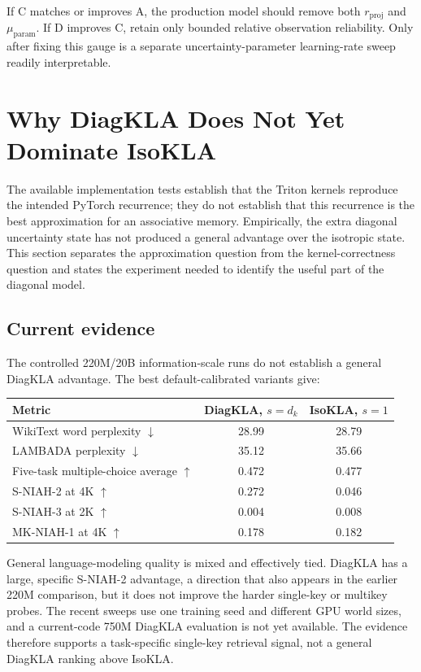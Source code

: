 \documentclass[11pt]{article}
\begin{document}
If C matches or improves A, the production model should remove both $r_{\mathrm{proj}}$ and
$\mu_{\mathrm{param}}$. If D improves C, retain only bounded relative observation reliability.
Only after fixing this gauge is a separate uncertainty-parameter learning-rate sweep readily
interpretable.

\section{Why DiagKLA Does Not Yet Dominate IsoKLA}

The available implementation tests establish that the Triton kernels reproduce the intended
PyTorch recurrence; they do not establish that this recurrence is the best approximation for an
associative memory. Empirically, the extra diagonal uncertainty state has not produced a general
advantage over the isotropic state. This section separates the approximation question from the
kernel-correctness question and states the experiment needed to identify the useful part of the
diagonal model.

\subsection{Current evidence}

The controlled 220M/20B information-scale runs do not establish a general DiagKLA advantage.
The best default-calibrated variants give:
\begin{center}
\begin{tabular}{lcc}
\toprule
Metric & DiagKLA, $s=d_k$ & IsoKLA, $s=1$ \\
\midrule
WikiText word perplexity $\downarrow$ & 28.99 & 28.79 \\
LAMBADA perplexity $\downarrow$ & 35.12 & 35.66 \\
Five-task multiple-choice average $\uparrow$ & 0.472 & 0.477 \\
S-NIAH-2 at 4K $\uparrow$ & 0.272 & 0.046 \\
S-NIAH-3 at 2K $\uparrow$ & 0.004 & 0.008 \\
MK-NIAH-1 at 4K $\uparrow$ & 0.178 & 0.182 \\
\bottomrule
\end{tabular}
\end{center}
General language-modeling quality is mixed and effectively tied. DiagKLA has a large, specific
S-NIAH-2 advantage, a direction that also appears in the earlier 220M comparison, but it does
not improve the harder single-key or multikey probes. The recent sweeps use one training seed
and different GPU world sizes, and a current-code 750M DiagKLA evaluation is not yet available.
The evidence therefore supports a task-specific single-key retrieval signal, not a general
DiagKLA ranking above IsoKLA.
\end{document}
